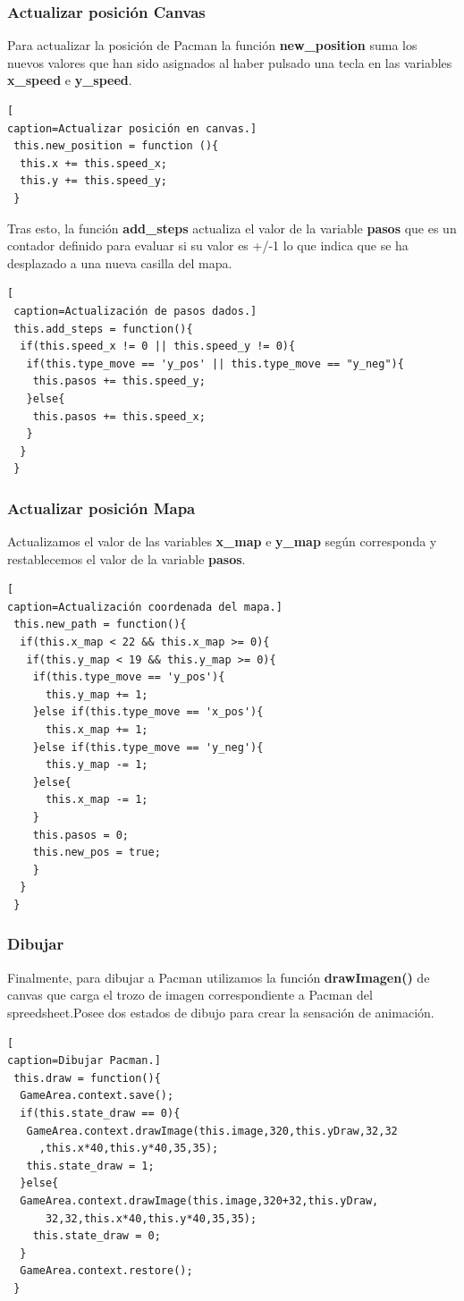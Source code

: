 \subsubsection*{Actualizar posición Canvas}
Para actualizar la posición de Pacman la función \textbf{new\_position} suma los nuevos valores que han sido asignados al haber pulsado una tecla en las variables \textbf{x\_speed} e \textbf{y\_speed}.
\begin{lstlisting}[
caption=Actualizar posición en canvas.]
 this.new_position = function (){
  this.x += this.speed_x;
  this.y += this.speed_y;
 }
 \end{lstlisting}
Tras esto, la función \textbf{add\_steps} actualiza el valor de la variable \textbf{pasos} que es un contador definido para evaluar si su valor es  +/-1 lo que indica que se ha desplazado a una nueva casilla del mapa.
\begin{lstlisting}[
 caption=Actualización de pasos dados.]
 this.add_steps = function(){
  if(this.speed_x != 0 || this.speed_y != 0){
   if(this.type_move == 'y_pos' || this.type_move == "y_neg"){
    this.pasos += this.speed_y;
   }else{
    this.pasos += this.speed_x;
   }
  }
 }
\end{lstlisting}
\subsubsection*{Actualizar posición Mapa}
Actualizamos el valor de las variables \textbf{x\_map} e \textbf{y\_map} según corresponda y restablecemos el valor de la variable \textbf{pasos}.
\begin{lstlisting}[
caption=Actualización coordenada del mapa.]
 this.new_path = function(){
  if(this.x_map < 22 && this.x_map >= 0){
   if(this.y_map < 19 && this.y_map >= 0){
    if(this.type_move == 'y_pos'){
      this.y_map += 1;	
    }else if(this.type_move == 'x_pos'){
      this.x_map += 1;
	}else if(this.type_move == 'y_neg'){
      this.y_map -= 1;
    }else{
      this.x_map -= 1;
	}
    this.pasos = 0;
    this.new_pos = true;	
    }
  }
 }
 \end{lstlisting}
\subsubsection*{Dibujar}
Finalmente, para dibujar a Pacman utilizamos la función \textbf{drawImagen()} de canvas que carga el trozo de imagen correspondiente a Pacman del spreedsheet.Posee dos estados de dibujo para crear la sensación de animación.
\begin{lstlisting}[
caption=Dibujar Pacman.]
 this.draw = function(){
  GameArea.context.save();
  if(this.state_draw == 0){
   GameArea.context.drawImage(this.image,320,this.yDraw,32,32
     ,this.x*40,this.y*40,35,35);
   this.state_draw = 1;
  }else{
  GameArea.context.drawImage(this.image,320+32,this.yDraw,
      32,32,this.x*40,this.y*40,35,35);
    this.state_draw = 0;
  }
  GameArea.context.restore();
 }
 \end{lstlisting}
